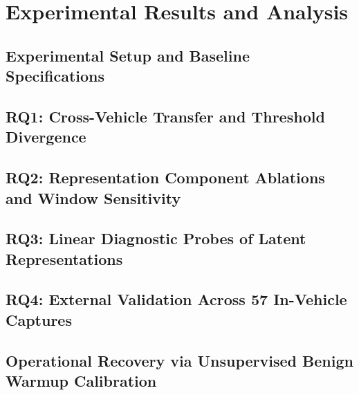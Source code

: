 \documentclass[12pt, a4paper, reqno, oneside]{book}
\begin{document}
\chapter{Experimental Results and Analysis}
\label{chap:results}

\section{Experimental Setup and Baseline Specifications}
\label{sec:res_setup}

\section{RQ1: Cross-Vehicle Transfer and Threshold Divergence}
\label{sec:res_rq1}

\section{RQ2: Representation Component Ablations and Window Sensitivity}
\label{sec:res_rq2}

\section{RQ3: Linear Diagnostic Probes of Latent Representations}
\label{sec:res_rq3}

\section{RQ4: External Validation Across 57 In-Vehicle Captures}
\label{sec:res_rq4}

\section{Operational Recovery via Unsupervised Benign Warmup Calibration}
\label{sec:res_calibration}
\end{document}
